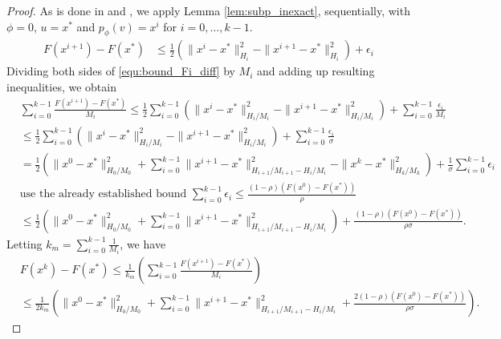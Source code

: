 \documentclass[11pt]{article}
\numberwithin{equation}{section}
\begin{document}
\begin{proof}
    As is done in  \cite{Beck2009} and \cite{Schmidtetal},  we apply Lemma \ref{lem:subp_inexact}, sequentially, with $\phi = 0$, $u=x^*$ and $p_{\phi}(v)=x^i$ for $i=0, \ldots, k-1$. 
    \begin{align}
    	\label{equ:bound_Fi_diff}
        F(x^{i+1}) - F(x^*)
        &\leq 
        \frac{1}{2} \left(\|x^i-x^*\|_{H_{i}}^2 
        - \|x^{i+1}-x^*\|_{H_{i}}^2 \right) 
        + \epsilon_i 
    \end{align}
    Dividing both sides of \eqref{equ:bound_Fi_diff} by $M_i$ and adding up resulting inequalities, we obtain  
    \begin{align*}
        &\sum_{i=0}^{k-1} \frac{F(x^{i+1}) - F(x^*)}{M_i}
        \leq 
        \frac{1}{2} \sum_{i=0}^{k-1} \left(\|x^i-x^*\|_{H_i/M_i}^2 
        - \|x^{i+1}-x^*\|_{H_i/M_i}^2 \right) 
        + \sum_{i=0}^{k-1} \frac{\epsilon_i}{M_i}  \\
        &\leq 
        \frac{1}{2} \sum_{i=0}^{k-1} \left(\|x^i-x^*\|_{H_i/M_i}^2 
        - \|x^{i+1}-x^*\|_{H_i/M_i}^2 \right) 
        + \sum_{i=0}^{k-1} \frac{\epsilon_i}{\sigma}  \\
        &= 
        \frac{1}{2} \left( \|x^0-x^*\|_{H_0/M_0}^2 
        + \sum_{i=0}^{k-1}\|x^{i+1} - x^*\|_{H_{i+1}/M_{i+1}-H_i/M_i}^2 
        - \|x^k-x^*\|_{H_k/M_k}^2 \right) 
        + \frac{1}{\sigma}\sum_{i=0}^{k-1}\epsilon_i \\
        &\mbox{use the already established bound $\sum_{i=0}^{k-1}\epsilon_i \leq \frac{(1-\rho)(F(x^0)-F(x^*))}{\rho}$}\\
        &\leq 
        \frac{1}{2} \left( \|x^0-x^*\|_{H_0/M_0}^2 
        + \sum_{i=0}^{k-1}\|x^{i+1} - x^*\|_{H_{i+1}/M_{i+1}-H_i/M_i}^2 \right) 
        + \frac{(1-\rho)(F(x^0)-F(x^*))}{\rho\sigma} .
    \end{align*}
    Letting $k_m = \sum_{i=0}^{k-1} \frac{1}{M_i}$, we have
    \begin{align*}
        &F(x^k) - F(x^*) \leq \frac{1}{k_m}( \sum_{i=0}^{k-1} \frac{F(x^{i+1}) - F(x^*)}{M_i} )\\        
        &\leq \frac{1}{2k_m}  \left( \|x^0-x^*\|_{H_0/M_0}^2 
        + \sum_{i=0}^{k-1}\|x^{i+1} - x^*\|_{H_{i+1}/M_{i+1}-H_i/M_i}^2 
        + \frac{2(1-\rho)(F(x^0)-F(x^*))}{\rho\sigma}\right) .
    \end{align*}
\end{proof}
\end{document}
